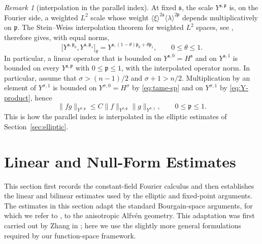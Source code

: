 \documentclass[11pt,reqno]{amsart}
\theoremstyle{plain}
\theoremstyle{definition}
\theoremstyle{remark}
\newtheorem{remark}[theorem]{Remark}
\numberwithin{equation}{section}
\newcommand{\sreg}{\mathfrak s}
\newcommand{\preg}{\mathfrak p}
\begin{document}
\begin{remark}[interpolation in the parallel index]\label{rem:Y-interpolation}
At fixed $\sreg$, the scale $Y^{\sreg,\preg}$ is, on the Fourier side, a
weighted $L^2$ scale whose weight
$\langle\xi\rangle^{2\sreg}\langle\lambda\rangle^{2\preg}$ depends
multiplicatively on $\preg$.  The Stein--Weiss interpolation theorem for
weighted $L^2$ spaces, see \cite[Theorem~5.5.3]{bergh}, therefore gives, with
equal norms,
\[
 \big[Y^{\sreg,\preg_0},Y^{\sreg,\preg_1}\big]_{\theta}
 =Y^{\sreg,(1-\theta)\preg_0+\theta\preg_1},
 \qquad 0\le\theta\le1 .
\]
In particular, a linear operator that is bounded on $Y^{\sreg,0}=H^{\sreg}$
and on $Y^{\sreg,1}$ is bounded on every $Y^{\sreg,\preg}$ with
$0\le\preg\le1$, with the interpolated operator norm. In particular, assume
that $\sigma>(n-1)/2$ and $\sigma+1>n/2$. Multiplication by an element of
$Y^{\sigma,1}$ is bounded on
$Y^{\sigma,0}=H^{\sigma}$ by \eqref{eq:tame-sp} and on $Y^{\sigma,1}$ by
\eqref{eq:Y-product}, hence
\begin{equation}\label{eq:Y-multiplier-interp}
 \|fg\|_{Y^{\sigma,\preg}}
 \le C\|f\|_{Y^{\sigma,\preg}}\|g\|_{Y^{\sigma,1}},
 \qquad 0\le\preg\le1 .
\end{equation}
This is how the parallel index is interpolated in the elliptic estimates of
Section~\ref{sec:elliptic}.
\end{remark}

\section{Linear and Null-Form Estimates}\label{sec:wave-estimates}
This section first records the constant-field Fourier calculus and then establishes the
linear and bilinear estimates used by the elliptic and fixed-point arguments. The estimates in this section adapt the standard Bourgain-space arguments,
for which we refer to \cite{Tao2006Dispersive}, to the anisotropic
Alfv\'en geometry. This adaptation was first carried out by Zhang in
\cite{Zhang2024}; here we use the slightly more general formulations required
by our function-space framework.
\end{document}
